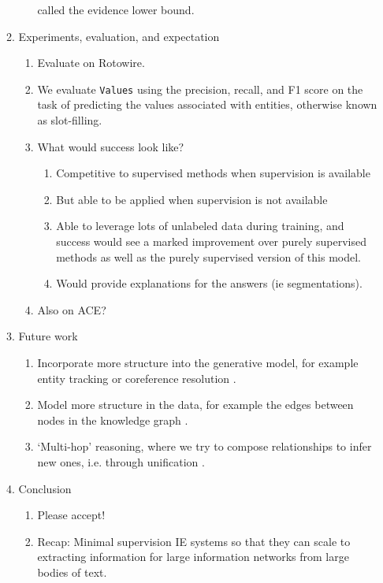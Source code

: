 \documentclass[12pt]{article}
\begin{document}
\begin{enumerate}
\begin{enumerate}
\begin{enumerate}
            called the evidence lower bound.
        \end{enumerate}
    \item Experiments, evaluation, and expectation
        \begin{enumerate}
        \item Evaluate on Rotowire.
        \item We evaluate \texttt{Values} using the precision, recall, and F1 score on the task
            of predicting the values associated with entities, otherwise known as slot-filling.
        \item What would success look like?
            \begin{enumerate}
            \item Competitive to supervised methods when supervision is available
            \item But able to be applied when supervision is not available
            \item Able to leverage lots of unlabeled data during training,
                and success would see a marked improvement over purely supervised methods
                as well as the purely supervised version of this model.
            \item Would provide explanations for the answers (ie segmentations).
            \end{enumerate}
        \item Also on ACE?
        \end{enumerate}
    \item Future work
        \begin{enumerate}
        \item Incorporate more structure into the generative model,
            for example entity tracking or coreference resolution \citet{haghighi2010coref}.
        \item Model more structure in the data, for example the edges between nodes
            in the knowledge graph \citet{chen2018diva}.
        \item `Multi-hop' reasoning, where we try to compose relationships to infer new ones,
            i.e. through unification \citet{chen2018diva,rock17prove}.
        \end{enumerate}
    \item Conclusion
        \begin{enumerate}
        \item Please accept!
        \item Recap: Minimal supervision IE systems so that they can scale to
            extracting information for large information networks from large bodies of text.
        \end{enumerate}
    \end{enumerate}
\end{enumerate}

\newpage


\end{document}
